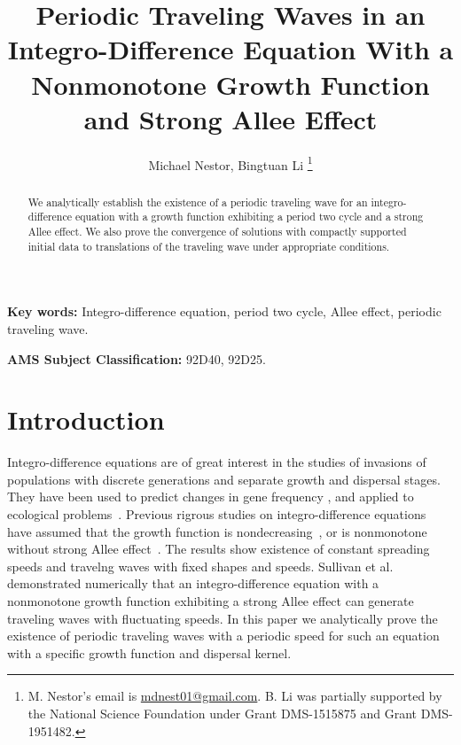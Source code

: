 \documentclass[11pt]{article}
\title{Periodic Traveling Waves in an Integro-Difference Equation With a Nonmonotone Growth Function and Strong Allee Effect}
\author{Michael Nestor, Bingtuan Li
\thanks{M. Nestor's email is \href{mailto:mdnest01@gmail.com}{mdnest01@gmail.com}. B. Li was partially supported by the National Science Foundation under Grant DMS-1515875 and Grant DMS-1951482.}}
\affil{Department of Mathematics, University of Louisville, \newline Louisville, KY 40292.}
\numberwithin{equation}{section}
\theoremstyle{definition}
\begin{document}
\maketitle


\begin{abstract}
We analytically establish the existence of a periodic traveling wave for an integro-difference equation with a growth function exhibiting a period two cycle and a strong Allee effect. We also prove the convergence of solutions with compactly supported initial data to translations of the traveling wave under appropriate conditions. 
\end{abstract}


{\bf Key words:} Integro-difference equation, period two cycle, Allee effect, periodic traveling wave.
\newline

{\bf AMS Subject Classification:} 92D40, 92D25.


\section{Introduction}

Integro-difference equations are of great interest in the studies of invasions of populations with discrete generations and separate growth and dispersal stages. They have been used to predict changes in gene frequency \cite{lui82a, lui82b, lui83, slatkin, w78}, and applied to ecological problems~\cite{hh, ks, kot89, kot92, kotbook, lut, nkl,otto}. Previous rigrous studies on integro-difference equations have assumed that the growth function is nondecreasing~\cite{w78, wein82}, or  is nonmonotone without strong Allee effect~\cite{lui83, wang}. The results show existence of constant spreading speeds and travelng waves with fixed shapes and speeds.   Sullivan et al. ~\cite{pnas} demonstrated numerically  that an integro-difference equation with a nonmonotone growth function exhibiting  a strong Allee effect can generate traveling waves with fluctuating speeds. In this paper we analytically prove the existence of periodic traveling waves with a periodic speed for such an equation with a specific growth function and dispersal kernel.
\end{document}

